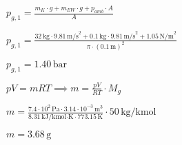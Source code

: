 \( p_{g,1} = \frac{m_K \cdot g + m_{EW} \cdot g + p_{amb} \cdot A}{A} \)  

\( p_{g,1} = \frac{32 \, \text{kg} \cdot 9.81 \, \text{m/s}^2 + 0.1 \, \text{kg} \cdot 9.81 \, \text{m/s}^2 + 1.05 \, \text{N/m}^2}{\pi \cdot (0.1 \, \text{m})^2} \)  

\( p_{g,1} = 1.40 \, \text{bar} \)  

\( pV = mRT \implies m = \frac{pV}{RT} \cdot M_g \)  

\( m = \frac{7.4 \cdot 10^2 \, \text{Pa} \cdot 3.14 \cdot 10^{-3} \, \text{m}^3}{8.31 \, \text{kJ/kmol·K} \cdot 773.15 \, \text{K}} \cdot 50 \, \text{kg/kmol} \)  

\( m = 3.68 \, \text{g} \)